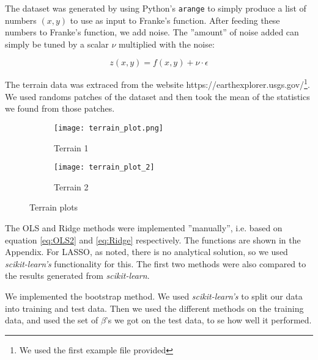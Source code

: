 \documentclass[a4paper]{article}
\begin{document}



The dataset was generated by using Python's \texttt{arange} to simply produce a list of numbers $(x, y)$ to use as input to Franke's function. After feeding these numbers to Franke's function, we add noise. The ''amount'' of noise added can simply be tuned by a scalar $\nu$ multiplied with the noise:

\begin{equation}
z(x,y) = f(x,y) +  \nu \cdot \epsilon
\end{equation}

The terrain data was extraced from the website https://earthexplorer.usgs.gov/\footnote{We used the first example file provided}. We used randoms patches of the dataset and then took the mean of the statistics we found from those patches.

\begin{figure}[ht]
\centering
\begin{subfigure}{.5\textwidth}
  \centering
  \texttt{[image: terrain\_plot.png]}
  \caption{Terrain 1}
  \label{fig:terrain1}
\end{subfigure}%
\begin{subfigure}{.5\textwidth}
  \centering
  \texttt{[image: terrain\_plot\_2]}
  \caption{Terrain 2}
  \label{fig:terrain2}
\end{subfigure}
\caption{Terrain plots}
\label{fig:Terrain}
\end{figure}


The OLS and Ridge methods were implemented ''manually'', i.e. based on equation \ref{eq:OLS2} and \ref{eq:Ridge} respectively. The functions are shown in the Appendix. For LASSO, as noted, there is no analytical solution, so we used \textit{scikit-learn's} functionality for this. The first two methods were also compared to the results generated from \textit{scikit-learn}.

We implemented the bootstrap method. We used \textit{scikit-learn's} to split our data into training and test data. Then we used the different methods on the training data, and used the set of $\beta$'s we got on the test data, to se how well it performed.
\end{document}
